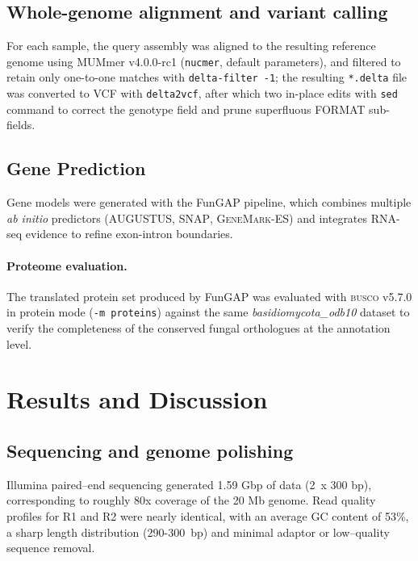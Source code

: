\documentclass[Journal,letterpaper]{theme}
\begin{document}
\subsection*{Whole-genome alignment and variant calling}

For each sample, the query assembly was aligned to the resulting
reference genome using MUMmer v4.0.0-rc1 (\verb|nucmer|, default
parameters), and filtered to retain only one-to-one matches with
\verb|delta-filter -1|; the resulting \texttt{*.delta} file was
converted to VCF with \verb|delta2vcf|, after which two in-place
edits with \verb|sed| command to correct the genotype field and prune
superfluous FORMAT sub-fields.

\subsection*{Gene Prediction}

Gene models were generated with the FunGAP pipeline, which combines
multiple \textit{ab initio} predictors (\textsc{AUGUSTUS},
\textsc{SNAP}, \textsc{GeneMark-ES}) and integrates RNA-seq evidence
to refine exon-intron boundaries.

\paragraph{Proteome evaluation.} The translated protein set produced
by FunGAP was evaluated with \textsc{busco} v5.7.0 in protein mode
(\texttt{-m proteins}) against the same \textit{basidiomycota\_odb10}
dataset to verify the completeness of the conserved fungal
orthologues at the annotation level.

\section*{Results and Discussion}

\subsection*{Sequencing and genome polishing}

Illumina paired--end sequencing generated 1.59 Gbp of data (2~x 300
bp), corresponding to roughly 80x coverage of the 20 Mb genome. Read
quality profiles for R1 and R2 were nearly identical, with an average
GC content of 53\%, a sharp length distribution (290-300~bp) and
minimal adaptor or low--quality sequence removal.
\end{document}

